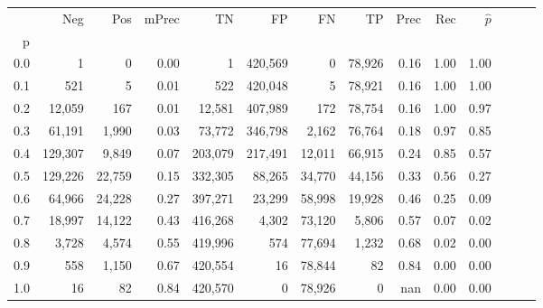 \begin{tabular}{rrrrrrrrrrrrrr}
\toprule
{} &      Neg &     Pos & mPrec &       TN &       FP &      FN &      TP &  Prec &   Rec & $\hat{p}$ \\
p   &          &         &       &          &          &         &         &       &       &           \\
\midrule
0.0 &        1 &       0 &  0.00 &        1 &  420,569 &       0 &  78,926 &  0.16 &  1.00 &      1.00 \\
0.1 &      521 &       5 &  0.01 &      522 &  420,048 &       5 &  78,921 &  0.16 &  1.00 &      1.00 \\
0.2 &   12,059 &     167 &  0.01 &   12,581 &  407,989 &     172 &  78,754 &  0.16 &  1.00 &      0.97 \\
0.3 &   61,191 &   1,990 &  0.03 &   73,772 &  346,798 &   2,162 &  76,764 &  0.18 &  0.97 &      0.85 \\
0.4 &  129,307 &   9,849 &  0.07 &  203,079 &  217,491 &  12,011 &  66,915 &  0.24 &  0.85 &      0.57 \\
0.5 &  129,226 &  22,759 &  0.15 &  332,305 &   88,265 &  34,770 &  44,156 &  0.33 &  0.56 &      0.27 \\
0.6 &   64,966 &  24,228 &  0.27 &  397,271 &   23,299 &  58,998 &  19,928 &  0.46 &  0.25 &      0.09 \\
0.7 &   18,997 &  14,122 &  0.43 &  416,268 &    4,302 &  73,120 &   5,806 &  0.57 &  0.07 &      0.02 \\
0.8 &    3,728 &   4,574 &  0.55 &  419,996 &      574 &  77,694 &   1,232 &  0.68 &  0.02 &      0.00 \\
0.9 &      558 &   1,150 &  0.67 &  420,554 &       16 &  78,844 &      82 &  0.84 &  0.00 &      0.00 \\
1.0 &       16 &      82 &  0.84 &  420,570 &        0 &  78,926 &       0 &   nan &  0.00 &      0.00 \\
\bottomrule
\end{tabular}
